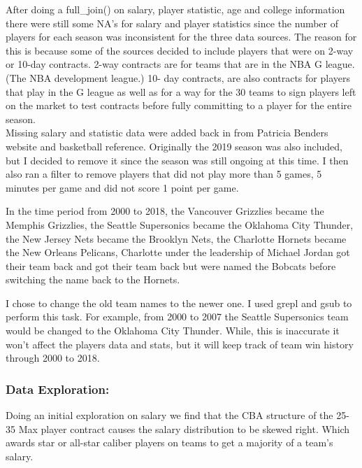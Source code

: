 \documentclass[]{article}
\begin{document}
After doing a full\_join() on salary, player statistic, age and college
information there were still some NA's for salary and player statistics
since the number of players for each season was inconsistent for the
three data sources. The reason for this is because some of the sources
decided to include players that were on 2-way or 10-day contracts. 2-way
contracts are for teams that are in the NBA G league. (The NBA
development league.) 10- day contracts, are also contracts for players
that play in the G league as well as for a way for the 30 teams to sign
players left on the market to test contracts before fully committing to
a player for the entire season.\\
Missing salary and statistic data were added back in from Patricia
Benders website and basketball reference. Originally the 2019 season was
also included, but I decided to remove it since the season was still
ongoing at this time. I then also ran a filter to remove players that
did not play more than 5 games, 5 minutes per game and did not score 1
point per game.

In the time period from 2000 to 2018, the Vancouver Grizzlies became the
Memphis Grizzlies, the Seattle Supersonics became the Oklahoma City
Thunder, the New Jersey Nets became the Brooklyn Nets, the Charlotte
Hornets became the New Orleans Pelicans, Charlotte under the leadership
of Michael Jordan got their team back and got their team back but were
named the Bobcats before switching the name back to the Hornets.

I chose to change the old team names to the newer one. I used grepl and
gsub to perform this task. For example, from 2000 to 2007 the Seattle
Supersonics team would be changed to the Oklahoma City Thunder. While,
this is inaccurate it won't affect the players data and stats, but it
will keep track of team win history through 2000 to 2018.

\subsubsection{\texorpdfstring{\textbf{Data
Exploration:}}{Data Exploration:}}\label{data-exploration}

Doing an initial exploration on salary we find that the CBA structure of
the 25-35 Max player contract causes the salary distribution to be
skewed right. Which awards star or all-star caliber players on teams to
get a majority of a team's salary.
\end{document}
